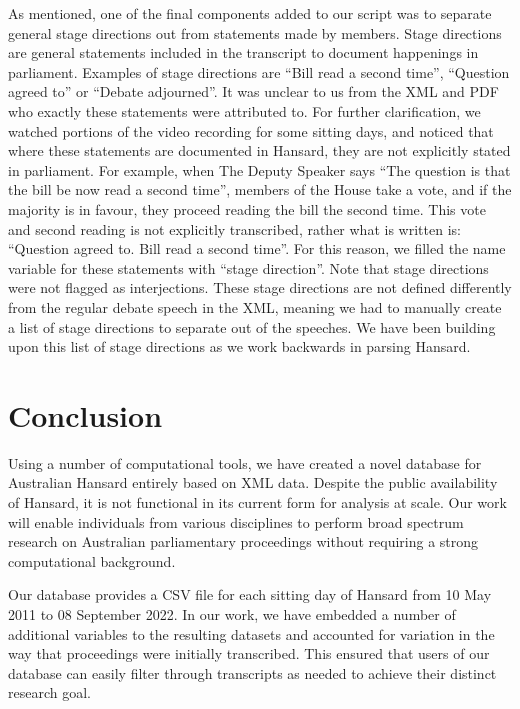 \documentclass[
  letterpaper,
  DIV=11,
  numbers=noendperiod]{scrartcl}
\begin{document}
As mentioned, one of the final components added to our script was to
separate general stage directions out from statements made by members.
Stage directions are general statements included in the transcript to
document happenings in parliament. Examples of stage directions are
``Bill read a second time'', ``Question agreed to'' or ``Debate
adjourned''. It was unclear to us from the XML and PDF who exactly these
statements were attributed to. For further clarification, we watched
portions of the video recording for some sitting days, and noticed that
where these statements are documented in Hansard, they are not
explicitly stated in parliament. For example, when The Deputy Speaker
says ``The question is that the bill be now read a second time'',
members of the House take a vote, and if the majority is in favour, they
proceed reading the bill the second time. This vote and second reading
is not explicitly transcribed, rather what is written is: ``Question
agreed to. Bill read a second time''. For this reason, we filled the
name variable for these statements with ``stage direction''. Note that
stage directions were not flagged as interjections. These stage
directions are not defined differently from the regular debate speech in
the XML, meaning we had to manually create a list of stage directions to
separate out of the speeches. We have been building upon this list of
stage directions as we work backwards in parsing Hansard.

\hypertarget{sec-conclusion}{%
\section{Conclusion}\label{sec-conclusion}}

Using a number of computational tools, we have created a novel database
for Australian Hansard entirely based on XML data. Despite the public
availability of Hansard, it is not functional in its current form for
analysis at scale. Our work will enable individuals from various
disciplines to perform broad spectrum research on Australian
parliamentary proceedings without requiring a strong computational
background.

Our database provides a CSV file for each sitting day of Hansard from 10
May 2011 to 08 September 2022. In our work, we have embedded a number of
additional variables to the resulting datasets and accounted for
variation in the way that proceedings were initially transcribed. This
ensured that users of our database can easily filter through transcripts
as needed to achieve their distinct research goal.
\end{document}
